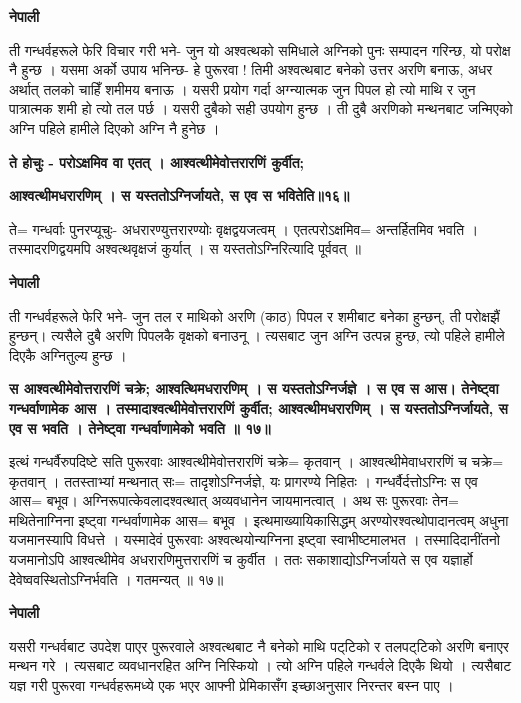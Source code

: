 \documentclass[11pt, a5paper]{article}
\begin{document}
\textbf{नेपाली}

ती गन्धर्वहरूले फेरि विचार गरी भने- जुन यो अश्वत्थको समिधाले अग्निको पुनः सम्पादन गरिन्छ, यो परोक्ष नै हुन्छ । यसमा अर्को उपाय भनिन्छ- हे पुरूरवा ! तिमी अश्वत्थबाट बनेको उत्तर अरणि बनाऊ, अधर अर्थात् तलको चाहिँ शमीमय बनाऊ । यसरी प्रयोग गर्दा अग्न्यात्मक जुन पिपल हो त्यो माथि र जुन पात्रात्मक शमी हो त्यो तल पर्छ । यसरी दुबैको सही उपयोग हुन्छ । ती दुबै अरणिको मन्थनबाट जन्मिएको अग्नि पहिले हामीले दिएको अग्नि नै हुनेछ ।

\textbf{ते होचुः - परोऽक्षमिव वा एतत् । आश्वत्थीमेवोत्तरारणिं कुर्वीत;}

\textbf{आश्वत्थीमधरारणिम् । स यस्ततोऽग्निर्जायते, स एव स भवितेति॥१६॥}

ते= गन्धर्वाः पुनरप्यूचुः- अधरारण्युत्तरारण्योः वृक्षद्वयजत्वम् । एतत्परोऽक्षमिव= अन्तर्हितमिव भवति । तस्मादरणिद्वयमपि अश्वत्थवृक्षजं कुर्यात् । स यस्ततोऽग्निरित्यादि पूर्ववत् ॥

\textbf{नेपाली}

ती गन्धर्वहरूले फेरि भने- जुन तल र माथिको अरणि (काठ) पिपल र शमीबाट बनेका हुन्छन्, ती परोक्षझैं हुन्छन्। त्यसैले दुबै अरणि पिपलकै वृक्षको बनाउनू । त्यसबाट जुन अग्नि उत्पन्न हुन्छ, त्यो पहिले हामीले दिएकै अग्नितुल्य हुन्छ ।

\textbf{स आश्वत्थीमेवोत्तरारणिं चक्रे; आश्वत्थिमधरारणिम् । स यस्ततोऽग्निर्जज्ञे । स एव स आस। तेनेष्ट्‌वा  गन्धर्वाणामेक आस । तस्मादाश्वत्थीमेवोत्तरारणिं कुर्वीत; आश्वत्थीमधरारणिम् । स यस्ततोऽग्निर्जायते, स एव स भवति । तेनेष्ट्‌वा गन्धर्वाणामेको भवति ॥ १७॥}

इत्थं गन्धर्वैरुपदिष्टे सति पुरूरवाः आश्वत्थीमेवोत्तरारणिं चक्रे= कृतवान् । आश्वत्थीमेवाधरारणिं च चक्रे= कृतवान् । ततस्ताभ्यां मन्थनात् सः= तादृशोऽग्निर्जज्ञे, यः प्रागरण्ये निहितः । गन्धर्वैर्दत्तोऽग्निः स एव आस= बभूव। अग्निरूपात्केवलादश्वत्थात् अव्यवधानेन जायमानत्वात् । अथ सः पुरूरवाः तेन= मथितेनाग्निना इष्ट्‌वा गन्धर्वाणामेक आस= बभूव । इत्थमाख्यायिकासिद्धम् अरण्योरश्वत्थोपादानत्वम् अधुना यजमानस्यापि विधत्ते । यस्मादेवं पुरूरवाः अश्वत्थयोन्यग्निना इष्ट्‌वा स्वाभीष्टमालभत । तस्मादिदानींतनो यजमानोऽपि आश्वत्थीमेव अधरारणिमुत्तरारणिं च कुर्वीत । ततः सकाशाद्योऽग्निर्जायते स एव यज्ञार्हो  देेवेष्ववस्थितोऽग्निर्भवति । गतमन्यत् ॥ १७॥

\textbf{नेपाली}

यसरी गन्धर्वबाट उपदेश पाएर पुरूरवाले अश्वत्थबाट नै बनेको माथि पट्‌टिको र तलपट्‌टिको अरणि बनाएर मन्थन गरे । त्यसबाट व्यवधानरहित अग्नि निस्कियो । त्यो अग्नि पहिले गन्धर्वले दिएकै थियो । त्यसैबाट यज्ञ गरी पुरूरवा गन्धर्वहरूमध्ये एक भएर आफ्नी प्रेमिकासँग इच्छाअनुसार निरन्तर बस्न पाए ।
\end{document}
